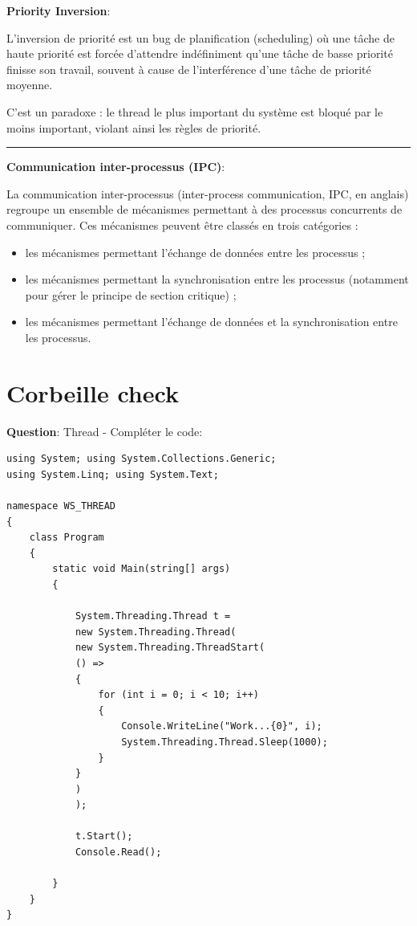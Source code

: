 \newpage

\noindent \textbf{Priority Inversion}:

\noindent L'inversion de priorité est un bug de planification (scheduling) où une tâche de haute priorité est forcée d'attendre indéfiniment qu'une tâche de basse priorité finisse son travail, souvent à cause de l'interférence d'une tâche de priorité moyenne.

\noindent C'est un paradoxe : le thread le plus important du système est bloqué par le moins important, violant ainsi les règles de priorité.

\begin{center}
\rule{5cm}{0.4pt}
\end{center}

\vspace{0.5cm}

\noindent \textbf{Communication inter-processus (IPC)}:

\noindent La communication inter-processus (inter-process communication, IPC, en anglais) regroupe un ensemble de mécanismes permettant à des processus concurrents de communiquer. Ces mécanismes peuvent être classés en trois catégories :
\begin{itemize}
    \item les mécanismes permettant l'échange de données entre les processus ;
    \item les mécanismes permettant la synchronisation entre les processus (notamment pour gérer le principe de section critique) ;
    \item les mécanismes permettant l'échange de données et la synchronisation entre les processus.
\end{itemize}
    
\newpage

\section*{Corbeille check}

\noindent \textbf{Question}: Thread - Compléter le code:

\begin{verbatim}
using System; using System.Collections.Generic;
using System.Linq; using System.Text;

namespace WS_THREAD
{
    class Program
    {
        static void Main(string[] args)
        {

            System.Threading.Thread t =
            new System.Threading.Thread(
            new System.Threading.ThreadStart(
            () =>
            {
                for (int i = 0; i < 10; i++)
                {
                    Console.WriteLine("Work...{0}", i);
                    System.Threading.Thread.Sleep(1000);
                }
            }
            )
            );

            t.Start();
            Console.Read();

        }
    }
}
\end{verbatim}

